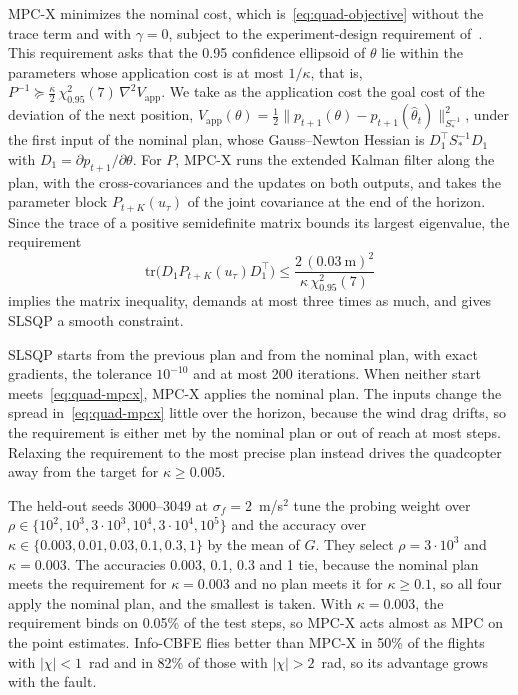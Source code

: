 \documentclass{l4dc2027}
\def\tr{\text{tr}}
\begin{document}
MPC-X minimizes the nominal cost, which is~\eqref{eq:quad-objective} without the trace term and with $\gamma = 0$, subject to the experiment-design requirement of~\citet{larsson2013model}. This requirement asks that the 0.95 confidence ellipsoid of $\theta$ lie within the parameters whose application cost is at most $1/\kappa$, that is, $P^{-1} \succeq \tfrac{\kappa}{2}\, \chi^2_{0.95}(7)\, \nabla^2 V_{\mathrm{app}}$. We take as the application cost the goal cost of the deviation of the next position, $V_{\mathrm{app}}(\theta) = \tfrac{1}{2}\|p_{t+1}(\theta) - p_{t+1}(\hat\theta_t)\|^2_{S_*^{-1}}$, under the first input of the nominal plan, whose Gauss--Newton Hessian is $D_1^\top S_*^{-1} D_1$ with $D_1 = \partial p_{t+1}/\partial\theta$. For $P$, MPC-X runs the extended Kalman filter along the plan, with the cross-covariances and the updates on both outputs, and takes the parameter block $P_{t+K}(u_\tau)$ of the joint covariance at the end of the horizon. Since the trace of a positive semidefinite matrix bounds its largest eigenvalue, the requirement
\begin{equation}\label{eq:quad-mpcx}
	\tr\big(D_1 P_{t+K}(u_\tau) D_1^\top\big) \leq \frac{2\,(0.03~\mathrm{m})^2}{\kappa\, \chi^2_{0.95}(7)}
\end{equation}
implies the matrix inequality, demands at most three times as much, and gives SLSQP a smooth constraint.

SLSQP starts from the previous plan and from the nominal plan, with exact gradients, the tolerance $10^{-10}$ and at most 200 iterations. When neither start meets~\eqref{eq:quad-mpcx}, MPC-X applies the nominal plan. The inputs change the spread in~\eqref{eq:quad-mpcx} little over the horizon, because the wind drag drifts, so the requirement is either met by the nominal plan or out of reach at most steps. Relaxing the requirement to the most precise plan instead drives the quadcopter away from the target for $\kappa \geq 0.005$.

The held-out seeds 3000--3049 at $\sigma_f = 2$~m/s$^2$ tune the probing weight over $\rho \in \{10^2, 10^3, 3 \cdot 10^3, 10^4, 3 \cdot 10^4, 10^5\}$ and the accuracy over $\kappa \in \{0.003, 0.01, 0.03, 0.1, 0.3, 1\}$ by the mean of $G$. They select $\rho = 3 \cdot 10^3$ and $\kappa = 0.003$. The accuracies 0.003, 0.1, 0.3 and 1 tie, because the nominal plan meets the requirement for $\kappa = 0.003$ and no plan meets it for $\kappa \geq 0.1$, so all four apply the nominal plan, and the smallest is taken. With $\kappa = 0.003$, the requirement binds on 0.05\% of the test steps, so MPC-X acts almost as MPC on the point estimates. Info-CBFE flies better than MPC-X in 50\% of the flights with $|\chi| < 1$~rad and in 82\% of those with $|\chi| > 2$~rad, so its advantage grows with the fault.
\end{document}
